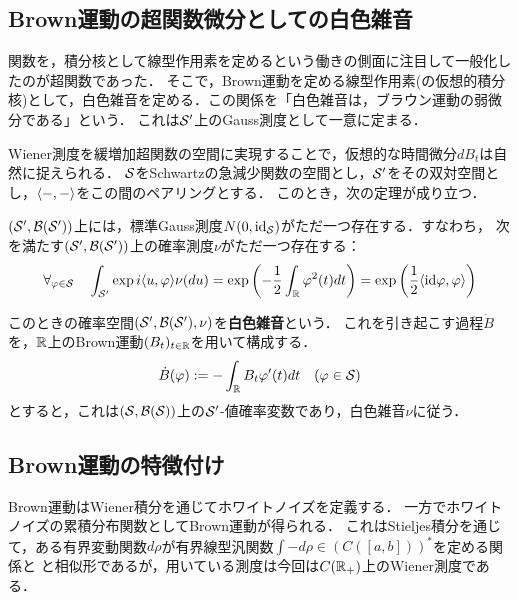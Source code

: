 \documentclass[uplatex,dvipdfmx]{jsreport}
\begin{document}
\subsection{Brown運動の超関数微分としての白色雑音}

\begin{tcolorbox}[colframe=ForestGreen, colback=ForestGreen!10!white,breakable,colbacktitle=ForestGreen!40!white,coltitle=black,fonttitle=\bfseries\sffamily,
title=]
    関数を，積分核として線型作用素を定めるという働きの側面に注目して一般化したのが超関数であった．
    そこで，Brown運動を定める線型作用素(の仮想的積分核)として，白色雑音を定める．この関係を「白色雑音は，ブラウン運動の弱微分である」という．
    これは$\S'$上のGauss測度として一意に定まる．
\end{tcolorbox}

\begin{discussion}
    Wiener測度を緩増加超関数の空間に実現することで，仮想的な時間微分$dB_t$は自然に捉えられる．
    $\S$をSchwartzの急減少関数の空間とし，$\S'$をその双対空間とし，$\brac{-,-}$をこの間のペアリングとする．
    このとき，次の定理が成り立つ．
    \begin{theorem}[白色雑音の存在定理]\label{thm-existence-of-white-noise}
        $(\S',\B(\S'))$上には，標準Gauss測度$N(0,\id_{\S})$がただ一つ存在する．すなわち，
        次を満たす$(\S',\B(\S'))$上の確率測度$\nu$がただ一つ存在する：
        \[\forall_{\varphi\in\S}\quad\int_{\S'}\exp{i\brac{u,\varphi}}\nu(du)=\exp\paren{-\frac{1}{2}\int_\R\varphi^2(t)dt}=\exp\paren{\frac{1}{2}\brac{\id\varphi,\varphi}}\]
    \end{theorem}
    このときの確率空間$(\S',\B(\S'),\nu)$を\textbf{白色雑音}という．
    これを引き起こす過程$\dot{B}$を，$\R$上のBrown運動$(B_t)_{t\in\R}$を用いて構成する．
    \[\dot{B}(\varphi):=-\int_\R B_t\varphi'(t)dt\quad(\varphi\in\S)\]
    とすると，これは$(\S,\B(\S))$上の$\S'$-値確率変数であり，白色雑音$\nu$に従う．
\end{discussion}

\subsection{Brown運動の特徴付け}

\begin{tcolorbox}[colframe=ForestGreen, colback=ForestGreen!10!white,breakable,colbacktitle=ForestGreen!40!white,coltitle=black,fonttitle=\bfseries\sffamily,
title=]
    Brown運動はWiener積分を通じてホワイトノイズを定義する．
    一方でホワイトノイズの累積分布関数としてBrown運動が得られる．
    これはStieljes積分を通じて，ある有界変動関数$d\rho$が有界線型汎関数$\int-d\rho\in (C([a,b]))^*$を定める関係と
    と相似形であるが，用いている測度は今回は$C(\R_+)$上のWiener測度である．
\end{tcolorbox}
\end{document}
